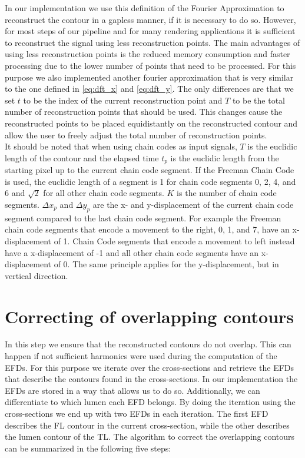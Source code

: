 \documentclass[thesis.tex]{subfiles}
\begin{document}
 
In our implementation we use this definition of the Fourier Approximation to reconstruct the contour in a gapless manner, if it is necessary to do so. However, for most steps of our pipeline and for many rendering applications it is sufficient to reconstruct the signal using less reconstruction points. The main advantages of using less reconstruction points is the reduced memory consumption and faster processing due to the lower number of points that need to be processed. For this purpose we also implemented another fourier approximation that is very similar to the one defined in \ref{eq:dft_x} and \ref{eq:dft_y}. The only differences are that we set $t$ to be the index of the current reconstruction point and $T$ to be the total number of reconstruction points that should be used. This changes cause the reconstructed points to be placed equidistantly on the reconstructed contour and allow the user to freely adjust the total number of reconstruction points.\\ 

 


It should be noted that when using chain codes as input signals, $T$ is the euclidic length of the contour and the elapsed time $t_p$ is the euclidic length from the starting pixel up to the current chain code segment. If the Freeman Chain Code is used, the euclidic length of a segment is 1 for chain code segments 0, 2, 4, and 6 and $\sqrt{2}$ for all other chain code segments. $K$ is the number of chain code segments. $\Delta x_p$ and $\Delta y_p$ are the x- and y-displacement of the current chain code segment compared to the last chain code segment. For example the Freeman chain code segments that encode a movement to the right, 0, 1, and 7, have an x-displacement of 1. Chain Code segments that encode a movement to left instead have a x-displacement of -1 and all other chain code segments have an x-displacement of 0. The same principle applies for the y-displacement, but in vertical direction.

\section{Correcting of overlapping contours}
In this step we ensure that the reconstructed contours do not overlap. This can happen if not sufficient harmonics were used during the computation of the EFDs. For this purpose we iterate over the cross-sections and retrieve the EFDs that describe the contours found in the cross-sections. In our implementation the EFDs are stored in a way that allows us to do so. Additionally, we can differentiate to which lumen each EFD belongs. By doing the iteration using the cross-sections we end up with two EFDs in each iteration. The first EFD describes the FL contour in the current cross-section, while the other describes the lumen contour of the TL. 
The algorithm to correct the overlapping contours can be summarized in the following five steps:
\end{document}
